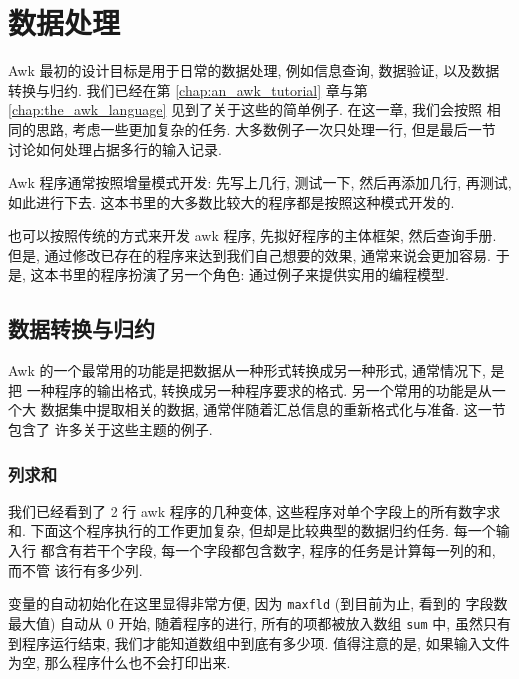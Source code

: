 \chapter{数据处理}
\label{chap:data_processing}

Awk 最初的设计目标是用于日常的数据处理, 例如信息查询, 数据验证, 以及数据
转换与归约. 我们已经在第 \ref{chap:an_awk_tutorial} 章与第
\ref{chap:the_awk_language} 见到了关于这些的简单例子. 在这一章, 我们会按照
相同的思路, 考虑一些更加复杂的任务. 大多数例子一次只处理一行, 但是最后一节
讨论如何处理占据多行的输入记录.

Awk 程序通常按照增量模式开发: 先写上几行, 测试一下, 然后再添加几行, 再测试,
如此进行下去. 这本书里的大多数比较大的程序都是按照这种模式开发的.

也可以按照传统的方式来开发 awk 程序, 先拟好程序的主体框架, 然后查询手册.
但是, 通过修改已存在的程序来达到我们自己想要的效果, 通常来说会更加容易.
于是, 这本书里的程序扮演了另一个角色: 通过例子来提供实用的编程模型.

\section{数据转换与归约}
\label{sec:data_transformation_and_reduction}

Awk 的一个最常用的功能是把数据从一种形式转换成另一种形式, 通常情况下, 是把
一种程序的输出格式, 转换成另一种程序要求的格式. 另一个常用的功能是从一个大
数据集中提取相关的数据, 通常伴随着汇总信息的重新格式化与准备. 这一节包含了
许多关于这些主题的例子.

\subsection{列求和}
\label{subsec:Summing_columns}

我们已经看到了 2 行 awk 程序的几种变体, 这些程序对单个字段上的所有数字求和.
下面这个程序执行的工作更加复杂, 但却是比较典型的数据归约任务. 每一个输入行
都含有若干个字段, 每一个字段都包含数字, 程序的任务是计算每一列的和, 而不管
该行有多少列.
变量的自动初始化在这里显得非常方便, 因为 \verb'maxfld' (到目前为止, 看到的
字段数最大值) 自动从 0 开始, 随着程序的进行, 所有的项都被放入数组 \verb'sum'
中, 虽然只有到程序运行结束, 我们才能知道数组中到底有多少项. 值得注意的是,
如果输入文件为空, 那么程序什么也不会打印出来.

